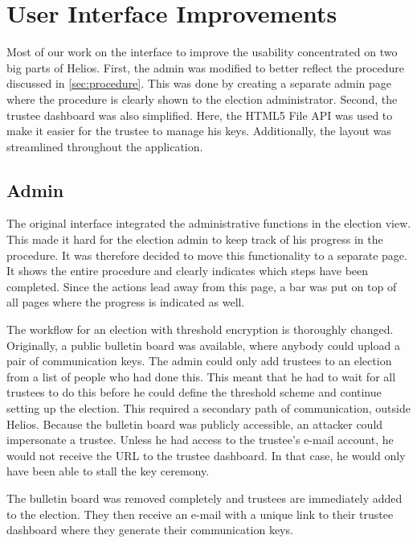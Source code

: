 %
%

\section{User Interface Improvements}
\label{sec:user_interface_improvements}

Most of our work on the interface to improve the usability concentrated on two big parts of Helios. First, the admin was modified to better reflect the procedure discussed in \ref{sec:procedure}. This was done by creating a separate admin page where the procedure is clearly shown to the election administrator. Second, the trustee dashboard was also simplified. Here, the HTML5 File API was used to make it easier for the trustee to manage his keys. Additionally, the layout was streamlined throughout the application. 

\subsection{Admin}

The original interface integrated the administrative functions in the election view. This made it hard for the election admin to keep track of his progress in the procedure. It was therefore decided to move this functionality to a separate page. It shows the entire procedure and clearly indicates which steps have been completed. Since the actions lead away from this page, a bar was put on top of all pages where the progress is indicated as well.

\par The workflow for an election with threshold encryption is thoroughly changed. Originally, a public bulletin board was available, where anybody could upload a pair of communication keys. The admin could only add trustees to an election from a list of people who had done this. This meant that he had to wait for all trustees to do this before he could define the threshold scheme and continue setting up the election. This required a secondary path of communication, outside Helios. Because the bulletin board was publicly accessible, an attacker could impersonate a trustee. Unless he had access to the trustee's e-mail account, he would not receive the URL to the trustee dashboard. In that case, he would only have been able to stall the key ceremony.

\par The bulletin board was removed completely and trustees are immediately added to the election. They then receive an e-mail with a unique link to their trustee dashboard where they generate their communication keys.

